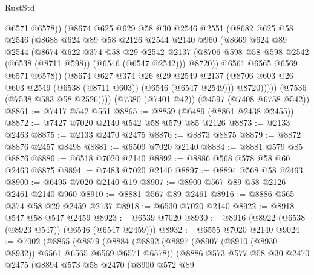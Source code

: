 \begin{lexlean}{RustStd}
\begin{coremodule}
                  @6571
                  @6578))
              (@8674
                @625
                @629
                @58
                @30
                @2546
                @2551
                (@8682
                  @625
                  @58
                  @2546
                  (@8688
                    @624
                    @89
                    @58
                    @2126
                    @2544
                    @2140
                    @960
                    (@8669
                      @624
                      @89
                      @2544
                      (@8674
                        @622
                        @374
                        @58
                        @29
                        @2542
                        @2137
                        (@8706 @598 @58 @598 @2542 (@6538 (@8711 @598)) (@6546 (@6547 @2542)))
                        @8720))
                    @6561
                    @6565
                    @6569
                    @6571
                    @6578))
                (@8674
                  @627
                  @374
                  @26
                  @29
                  @2549
                  @2137
                  (@8706 @603 @26 @603 @2549 (@6538 (@8711 @603)) (@6546 (@6547 @2549)))
                  @8720)))))
        (@7536 (@7538 @583 @58 @2526))))
    (@7380 (@7401 @42))
    (@4597 (@7408 @6758 @542))
@8861 := @7417 @542 @561
@8865 := @8859 (@6489 (@8861 @2438 @2455))
@8872 := @7427 @7020 @2140 @542 @58 @579 @85 @2126
@8873 := @2133 @2463
@8875 := @2133 @2470 @2475
@8876 := @8873 @8875
@8879 := @8872 @8876 @2457 @8498
@8881 := @6509 @7020 @2140
@8884 := @8881 @579 @85 @8876
@8886 := @6518 @7020 @2140
@8892 := @8886 @568 @578 @58 @60 @2463 @8875
@8894 := @7483 @7020 @2140
@8897 := @8894 @568 @58 @2463
@8900 := @6495 @7020 @2140 @19
@8907 := @8900 @567 @89 @58 @2126 @2461 @2140 @960
@8910 := @8881 @567 @89 @2461
@8916 := @8886 @565 @374 @58 @29 @2459 @2137
@8918 := @6530 @7020 @2140
@8922 := @8918 @547 @58 @547 @2459
@8923 := @6539 @7020
@8930 := @8916 (@8922 (@6538 (@8923 @547)) (@6546 (@6547 @2459)))
@8932 := @6555 @7020 @2140
@9024 := @7002
    (@8865
      (@8879
        (@8884
          (@8892
            (@8897 (@8907 (@8910 (@8930 @8932)) @6561 @6565 @6569 @6571 @6578))
            (@8886
              @573
              @577
              @58
              @30
              @2470
              @2475
              (@8894
                @573
                @58
                @2470
                (@8900
                  @572
                  @89

\end{coremodule}
\end{lexlean}
